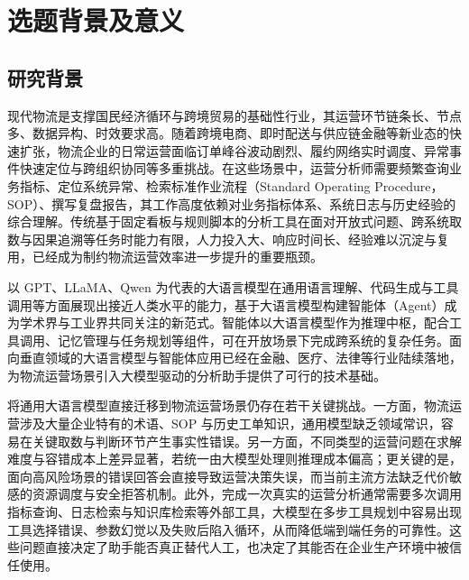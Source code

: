 
\chapter{选题背景及意义}

\section{研究背景}

现代物流是支撑国民经济循环与跨境贸易的基础性行业，其运营环节链条长、节点多、数据异构、时效要求高。随着跨境电商、即时配送与供应链金融等新业态的快速扩张，物流企业的日常运营面临订单峰谷波动剧烈、履约网络实时调度、异常事件快速定位与跨组织协同等多重挑战。在这些场景中，运营分析师需要频繁查询业务指标、定位系统异常、检索标准作业流程（Standard Operating Procedure，SOP）、撰写复盘报告，其工作高度依赖对业务指标体系、系统日志与历史经验的综合理解。传统基于固定看板与规则脚本的分析工具在面对开放式问题、跨系统取数与因果追溯等任务时能力有限，人力投入大、响应时间长、经验难以沉淀与复用，已经成为制约物流运营效率进一步提升的重要瓶颈。

以 GPT、LLaMA、Qwen 为代表的大语言模型在通用语言理解、代码生成与工具调用等方面展现出接近人类水平的能力，基于大语言模型构建智能体（Agent）成为学术界与工业界共同关注的新范式。智能体以大语言模型作为推理中枢，配合工具调用、记忆管理与任务规划等组件，可在开放场景下完成跨系统的复杂任务。面向垂直领域的大语言模型与智能体应用已经在金融、医疗、法律等行业陆续落地，为物流运营场景引入大模型驱动的分析助手提供了可行的技术基础。

将通用大语言模型直接迁移到物流运营场景仍存在若干关键挑战。一方面，物流运营涉及大量企业特有的术语、SOP 与历史工单知识，通用模型缺乏领域常识，容易在关键取数与判断环节产生事实性错误。另一方面，不同类型的运营问题在求解难度与容错成本上差异显著，若统一由大模型处理则推理成本偏高；更关键的是，面向高风险场景的错误回答会直接导致运营决策失误，而当前主流方法缺乏代价敏感的资源调度与安全拒答机制。此外，完成一次真实的运营分析通常需要多次调用指标查询、日志检索与知识库检索等外部工具，大模型在多步工具规划中容易出现工具选择错误、参数幻觉以及失败后陷入循环，从而降低端到端任务的可靠性。这些问题直接决定了助手能否真正替代人工，也决定了其能否在企业生产环境中被信任使用。

